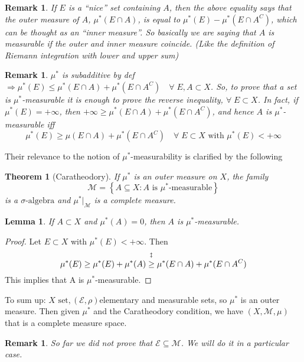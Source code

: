 \documentclass[a4paper,12pt]{article}
\theoremstyle{break}
\newtheorem{theorem}{Theorem}[section]
\newtheorem{remark}[section]{Remark}
\newtheorem{lemma}{Lemma}[section]
\newcommand{\sigalg}{\sigma\mbox{-algebra}}
\numberwithin{equation}{section}
\begin{document}
\begin{remark}
    If \(E\) is a ``nice'' set containing \(A\), then the above equality says that the outer measure of \(A\), \(\mu^*(E \cap A)\), is equal to \(\mu^*(E) - \mu^*(E \cap A^C)\), which can be thought as an ``inner measure''. So basically we are saying that \(A\) is measurable if the outer and inner measure coincide. (Like the definition of Riemann integration with lower and upper sum)
\end{remark}
\begin{remark}
    \(\mu^*\) is subadditive by def \(\Longrightarrow \mu^*(E) \leq \mu^*(E \cap A) + \mu^*(E \cap A^C) \quad \forall \; E, A \subset X\).  
    So, to prove that a set is \(\mu^*\)-measurable it is enough to prove the reverse inequality, \(\forall \; E \subset X\). In fact, if \(\mu^*(E) = +\infty\), then \(+\infty \geq \mu^*(E \cap A) + \mu^*(E \cap A^C)\), and hence \(A\) is \(\mu^*\)-measurable iff 
    \[
        \mu^*(E) \geq \mu(E \cap A) + \mu^*(E \cap A^C) \quad \forall \; E \subset X \mbox{ with } \mu^*(E) < +\infty
    \] 
\end{remark}
Their relevance to the notion of \(\mu^*\)-measurability is clarified by the following
\begin{theorem}[Caratheodory]
    If \(\mu^*\) is an outer measure on \(X\), the family
    \[
        \mathcal{M} = \left\lbrace A \subseteq X : A \mbox{ is }\mu^*\mbox{-measurable}\right\rbrace
    \]
    is a \(\sigalg\) and \(\mu^*\vert_{\mathcal{M}}\) is a complete measure.
\end{theorem}
\begin{lemma}
    If \(A \subset X\) and \(\mu^*(A) = 0\), then \(A\) is \(\mu^*\)-measurable.
\end{lemma}
\begin{proof}
    Let \(E \subset X\) with \(\mu^*(E) < +\infty\). Then 
    \[
        \mu^*(E) \geq \mu^*(E) + \mu^*(A) \overset{\symbolfootnotemark[3]{3}}{\geq}  \mu^*(E \cap A) + \mu^*(E \cap A^C)
    \]
    This implies that A is \(\mu^*\)-measurable.
\end{proof}
To sum up: \(X \mbox{ set}, (\mathcal{E}, \rho)\)elementary and measurable sets, so \(\mu^*\) is an outer measure. Then given \(\mu^*\) and the Caratheodory condition, we have \((X, \mathcal{M}, \mu)\) that is a complete measure space.
\begin{remark}
    So far we did not prove that \(\mathcal{E} \subseteq \mathcal{M}\). We will do it in a particular case.
\end{remark}
\end{document}
